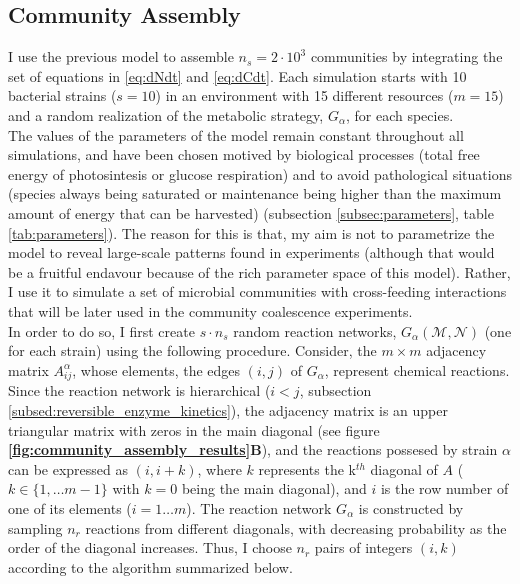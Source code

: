\documentclass[titlepage,11pt]{article}
\begin{document}
\begin{linenumbers}
\begin{singlespace}
				\subsection{Community Assembly}
				 I use the previous model to assemble $ n_{s} = 2 \cdot 10^3 $ communities by integrating the set of equations in \ref{eq:dNdt} and \ref{eq:dCdt}. Each simulation starts with 10 bacterial strains ($ s = 10 $) in an environment with 15 different resources ($ m = 15 $) and a random realization of the metabolic strategy, $ G_{\alpha} $, for each species.\\	
				The values of the parameters of the model remain constant throughout all simulations, and have been chosen motived by biological processes (total free energy of photosintesis or glucose respiration) and to avoid pathological situations (species always being saturated or maintenance being higher than the maximum amount of energy that can be harvested) (subsection \ref{subsec:parameters}, table \ref{tab:parameters}). The reason for this is that, my aim is not to parametrize the model to reveal large-scale patterns found in experiments (although that would be a fruitful endavour because of the rich parameter space of this model). Rather, I use it to simulate a set of microbial communities with cross-feeding interactions that will be later used in the community coalescence experiments.\\
				In order to do so, I first create $ s \cdot n_{s}  $ random reaction networks, $ G_{\alpha}(\mathcal{M}, \mathcal{N}) $ (one for each strain) using the following  procedure. Consider, the $ m \times m $ adjacency matrix $ A^{\alpha}_{ij} $, whose elements, the edges $ (i, j) $ of $ G_{\alpha}$, represent chemical reactions. Since the reaction network is hierarchical ($ i < j $, subsection \ref{subsed:reversible_enzyme_kinetics}), the adjacency matrix is an upper triangular matrix with zeros in the main diagonal (see figure \textbf{\ref{fig:community_assembly_results}B}), and the reactions possesed by strain $ \alpha $ can be expressed as $ (i, i + k) $, where $ k $ represents the k$ ^{th} $ diagonal of $ A $ ($ k \in \{1, \dots m - 1 \}$ with $ k = 0 $ being the main diagonal), and $ i $ is the row number of one of its elements ($ i = 1 \dots m $). The reaction network $ G_{\alpha} $ is constructed by sampling $ n_{r} $ reactions from  different diagonals, with decreasing probability as the order of the diagonal increases. Thus, I choose $ n_{r} $ pairs of integers $ (i , k )$ according to the algorithm summarized below.	
				\begin{enumerate}

\end{enumerate}
\end{singlespace}
\end{linenumbers}
\end{document}
